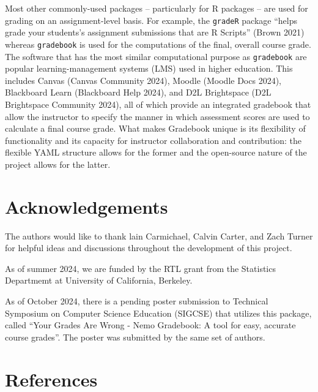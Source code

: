 \documentclass[10pt,a4paper,onecolumn]{article}
\begin{document}
Most other commonly-used packages -- particularly for R packages -- are
used for grading on an assignment-level basis. For example, the
\texttt{gradeR} package ``helps grade your students's assignment
submissions that are R Scripts'' (Brown 2021) whereas \texttt{gradebook}
is used for the computations of the final, overall course grade. The
software that has the most similar computational purpose as
\texttt{gradebook} are popular learning-management systems (LMS) used in
higher education. This includes Canvas (Canvas Community 2024), Moodle
(Moodle Docs 2024), Blackboard Learn (Blackboard Help 2024), and D2L
Brightspace (D2L Brightspace Community 2024), all of which provide an
integrated gradebook that allow the instructor to specify the manner in
which assessment scores are used to calculate a final course grade. What
makes Gradebook unique is its flexibility of functionality and its
capacity for instructor collaboration and contribution: the flexible
YAML structure allows for the former and the open-source nature of the
project allows for the latter.

\section{Acknowledgements}\label{acknowledgements}

The authors would like to thank lain Carmichael, Calvin Carter, and Zach
Turner for helpful ideas and discussions throughout the development of
this project.

As of summer 2024, we are funded by the RTL grant from the Statistics
Departmemt at University of California, Berkeley.

As of October 2024, there is a pending poster submission to Technical
Symposium on Computer Science Education (SIGCSE) that utilizes this
package, called ``Your Grades Are Wrong - Nemo Gradebook: A tool for
easy, accurate course grades''. The poster was submitted by the same set
of authors.

\section*{References}\label{references}
\end{document}
